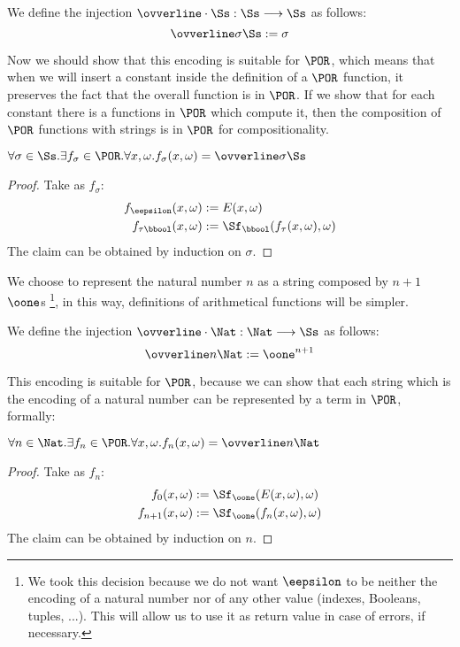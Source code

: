 \begin{conditional}{\notappendix}
  \begin{defn}
    We define the injection $\ovverline \cdot \Ss:  \Ss \longrightarrow \Ss$ as
    follows:
    \[
    \ovverline \sigma \Ss:= \sigma
    \]
  \end{defn}

  Now we should show that this encoding is suitable for $\POR$,
  which means that when we will insert a constant inside the definition of a
  $\POR$ function, it preserves the fact that the overall function is in $\POR$.
  If we show that for each constant there is a functions in
  $\POR$ which compute it,
  then the composition of $\POR$ functions with strings
  is in $\POR$ for compositionality.

  \begin{remark}
    $\forall \sigma \in \Ss. \exists f_\sigma \in \POR. \forall x, \omega.
    f_\sigma(x, \omega)= \ovverline \sigma \Ss$
  \end{remark}
  \begin{proof}
    Take as $f_\sigma$:
    \begin{align*}
      {f_{\eepsilon}}(x, \omega) &:= E(x, \omega) \\
      {f_{\tau\bbool}}(x, \omega)&:= \Sf_\bbool(f_\tau(x, \omega),\omega)
    \end{align*}
    The claim can be obtained by induction on $\sigma$.
  \end{proof}


  We choose to represent the natural number $n$ as a string composed by $n+1$
  $\oone$s
  \footnote{We took this decision because we do not want $\eepsilon$ to be neither
  the encoding of a natural number nor of any other value (indexes, Booleans, tuples, ...).
  This will allow us to use it as return value in case of errors, if necessary.},
  in this way, definitions of arithmetical functions will be simpler.

  \begin{defn}
    We define the injection $\ovverline \cdot \Nat:  \Nat \longrightarrow \Ss$ as
    follows:
    \[
    \ovverline n \Nat:= \oone^{n+1}
    \]
  \end{defn}

  This encoding is suitable for $\POR$, because we can show that each string
  which is the encoding of a natural number can be represented by a term in $\POR$,
  formally:

  \begin{remark}
    $\forall n \in \Nat. \exists f_n \in \POR. \forall x, \omega.
    f_n(x, \omega)= \ovverline n \Nat$
  \end{remark}
  \begin{proof}
    Take as $f_n$:
    \begin{align*}
      {f_0}(x, \omega) &:= \Sf_\oone(E(x, \omega),\omega) \\
      {f_{n+1}}(x, \omega)&:= \Sf_\oone(f_n(x, \omega),\omega)
    \end{align*}
    The claim can be obtained by induction on $n$.
  \end{proof}


\end{conditional}
